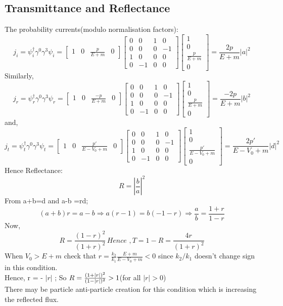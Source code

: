 \documentclass[11pt]{article}
\begin{document}
	\subsection{Transmittance and Reflectance}
	
	The probability currents(modulo normalisation factors):
	\[
		j_i = \psi_i^\dagger \gamma^0\gamma^3 \psi_i = \begin{bmatrix}1&0&\frac{p}{E+m}&0\end{bmatrix} \begin{bmatrix}0&0&1&0\\0&0&0&-1\\1&0&0&0\\0&-1&0&0\end{bmatrix} \begin{bmatrix}1\\0\\\frac{p}{E+m}\\0\end{bmatrix} = \frac{2p}{E+m}|a|^2
	\]
	Similarly,
	\[
		j_r = \psi_r^\dagger \gamma^0\gamma^3 \psi_r = \begin{bmatrix}1&0&\frac{-p}{E+m}&0\end{bmatrix} \begin{bmatrix}0&0&1&0\\0&0&0&-1\\1&0&0&0\\0&-1&0&0\end{bmatrix} \begin{bmatrix}1\\0\\\frac{p}{E+m}\\0\end{bmatrix} = \frac{-2p}{E+m}|b|^2
	\]
	and,
	\[
		j_t = \psi_t^\dagger \gamma^0\gamma^3 \psi_t = \begin{bmatrix}1&0&\frac{p'}{E-V_0+m}&0\end{bmatrix} \begin{bmatrix}0&0&1&0\\0&0&0&-1\\1&0&0&0\\0&-1&0&0\end{bmatrix} \begin{bmatrix}1\\0\\\frac{p'}{E-V_0+m}\\0\end{bmatrix} = \frac{2p'}{E-V_0+m}|d|^2
	\]
	Hence Reflectance:
	\[
		R = |\frac{b}{a}|^2
	\]
	From a+b=d and a-b =rd;
	\[
		(a + b)r = a-b \Rightarrow a(r-1) = b(-1-r) \Rightarrow \frac{a}{b} = \frac{1+r}{1-r}
	\]
	Now,
	\[
		R = \frac{(1-r)^2}{(1+r)^2} \, Hence \, \, , T = 1-R  = \frac{4r}{(1+r)^2}
	\]
	When \(V_0 > E + m\) check that \(r = \frac{k_2}{k_1}\frac{E+m}{E-V_0+m} < 0 \) since \(k_2/k_1\) doesn't change sign in this condition.\\
	Hence, r = - $|r|$ ;
	So \( R = \frac{(1+|r|)^2}{(1-|r|)^2}>1 \dotfill\)(for all $|r|>0$)\\
	There may be particle anti-particle creation for this condition which is increasing the reflected flux.
	
\end{document}
